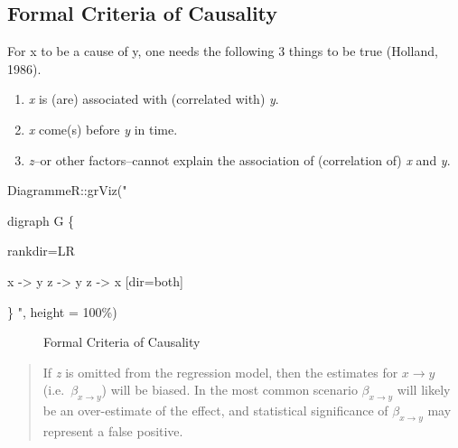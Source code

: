 \documentclass[
  letterpaper,
  DIV=11,
  numbers=noendperiod]{scrreprt}
\newenvironment{Shaded}{\begin{snugshade}}{\end{snugshade}}
\newcommand{\AttributeTok}[1]{\textcolor[rgb]{0.40,0.45,0.13}{#1}}
\newcommand{\FunctionTok}[1]{\textcolor[rgb]{0.28,0.35,0.67}{#1}}
\newcommand{\NormalTok}[1]{\textcolor[rgb]{0.00,0.23,0.31}{#1}}
\newcommand{\SpecialCharTok}[1]{\textcolor[rgb]{0.37,0.37,0.37}{#1}}
\newcommand{\StringTok}[1]{\textcolor[rgb]{0.13,0.47,0.30}{#1}}
\providecommand{\tightlist}{%
  \setlength{\itemsep}{0pt}\setlength{\parskip}{0pt}}\usepackage{longtable,booktabs,array}
\begin{document}
\hypertarget{formal-criteria-of-causality}{%
\subsection{Formal Criteria of
Causality}\label{formal-criteria-of-causality}}

For x to be a cause of y, one needs the following 3 things to be true
(Holland, 1986).

\begin{enumerate}
\def\labelenumi{\arabic{enumi}.}
\tightlist
\item
  \emph{x} is (are) associated with (correlated with) \emph{y}.
\item
  \emph{x} come(s) before \emph{y} in time.
\item
  \emph{z}--or other factors--cannot explain the association of
  (correlation of) \emph{x} and \emph{y}.
\end{enumerate}

\begin{Shaded}
\begin{Highlighting}[]
\NormalTok{DiagrammeR}\SpecialCharTok{::}\FunctionTok{grViz}\NormalTok{(}\StringTok{"}

\StringTok{digraph G \{}

\StringTok{rankdir=\textquotesingle{}LR\textquotesingle{}}

\StringTok{x {-}\textgreater{} y}
\StringTok{z {-}\textgreater{} y}
\StringTok{z {-}\textgreater{} x [dir=\textquotesingle{}both\textquotesingle{}]}

\StringTok{\} }
\StringTok{"}\NormalTok{, }\AttributeTok{height =} \StringTok{\textquotesingle{}100\%\textquotesingle{}}\NormalTok{)}
\end{Highlighting}
\end{Shaded}

\begin{figure}

{\centering 

}

\caption{\label{fig-causality}Formal Criteria of Causality}

\end{figure}

\begin{quote}
If \emph{z} is omitted from the regression model, then the estimates for
\(x \rightarrow y\) (i.e.~\(\beta_{x \rightarrow y}\)) will be biased.
In the most common scenario \(\beta_{x \rightarrow y}\) will likely be
an over-estimate of the effect, and statistical significance of
\(\beta_{x \rightarrow y}\) may represent a false positive.
\end{quote}
\end{document}
